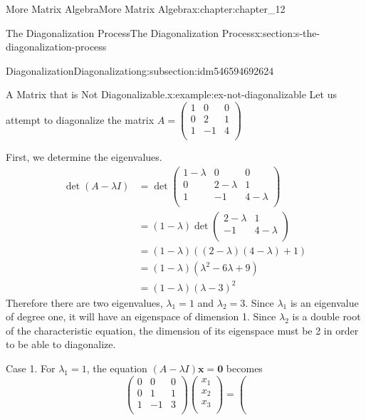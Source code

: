 \documentclass[oneside,10pt,]{book}
\numberwithin{equation}{section}
\renewcommand{\vec}[1]{\mathbf{#1}}
\begin{document}
\begin{chapterptx}{More Matrix Algebra}{}{More Matrix Algebra}{}{}{x:chapter:chapter_12}
\begin{sectionptx}{The Diagonalization Process}{}{The Diagonalization Process}{}{}{x:section:s-the-diagonalization-process}
\begin{subsectionptx}{Diagonalization}{}{Diagonalization}{}{}{g:subsection:idm546594692624}
\begin{example}{A Matrix that is Not Diagonalizable.}{x:example:ex-not-diagonalizable}
Let us attempt to diagonalize the matrix \(A = \left(
\begin{array}{ccc}
1 & 0 & 0 \\
0 & 2 & 1 \\
1 & -1 & 4 \\
\end{array}
\right)\)%
\par
First, we determine the eigenvalues.%
\begin{equation*}
\begin{split}
\det (A-\lambda  I) &= \det  \left(
\begin{array}{ccc}
1-\lambda  & 0 & 0 \\
0 & 2-\lambda  & 1 \\
1 & -1 & 4-\lambda  \\
\end{array}
\right)\\
&= (1-\lambda) \det \left(
\begin{array}{cc}
2-\lambda  & 1 \\
-1 & 4-\lambda  \\
\end{array}
\right)\\
& = (1-\lambda )((2-\lambda )(4-\lambda )+1)\\
& = (1-\lambda )\left(\lambda ^2-6\lambda  +9\right)\\
& = (1-\lambda)(\lambda -3)^2 
\end{split}
\end{equation*}
Therefore there are two eigenvalues, \(\lambda_1= 1\) and \(\lambda_2=3\).  Since \(\lambda_1\) is an eigenvalue of degree one, it will have an eigenspace of dimension 1.  Since \(\lambda_2\) is a double root of the characteristic equation, the dimension of its eigenspace must be 2 in order to be able to diagonalize.%
\par
Case 1. For \(\lambda_1= 1\),  the equation \((A-\lambda  I)\vec{x} = \vec{0}\) becomes%
\begin{equation*}
\left(
\begin{array}{ccc}
0 & 0 & 0 \\
0 & 1 & 1 \\
1 & -1 & 3 \\
\end{array}
\right)\left(
\begin{array}{c}
x_1 \\
x_2 \\
x_3 \\
\end{array}
\right)= \left(

\end{equation*}
\end{example}
\end{subsectionptx}
\end{sectionptx}
\end{chapterptx}
\end{document}
